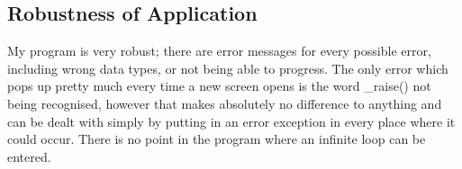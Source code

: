 \subsection{Robustness of Application}

My program is very robust; there are error messages for every possible error, including wrong data types, or not being able to progress. The only error which pops up pretty much every time a new screen opens is the word \_raise() not being recognised, however that makes absolutely no difference to anything and can be dealt with simply by putting in an error exception in every place where it could occur. There is no point in the program where an infinite loop can be entered.

